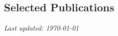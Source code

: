 \documentclass[letterpaper, 11pt]{article}
\begin{document}
\thispagestyle{empty}





%  
% 
% 



\subsection*{Selected Publications}
\renewcommand*{\labelenumi}{[S\theenumi]}

% 
% 
%  

{\noindent\it Last updated: \today}
\end{document}
